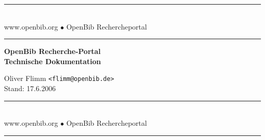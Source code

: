 \documentclass[11pt, twoside, a4paper, BCOR8mm, DIV12, bibtotoc,idxtotoc]{scrbook}
\begin{document}
\frontmatter

\begin{titlepage}

\begin{center}
\rule[-.1in]{16cm}{1mm}\\[3mm]
{\fontsize{20}{20pt}\selectfont
  www.openbib.org $\bullet$ OpenBib Rechercheportal}\\[-2mm]
\rule[-.1in]{16cm}{1mm}

\vspace{5cm}

  \textbf{\fontsize{30}{30pt}\selectfont OpenBib Recherche-Portal\\[3mm] Technische Dokumentation}

  \vspace{2cm}

  Oliver Flimm \texttt{<flimm@openbib.de>}\\
  Stand: 17.6.2006

  \vspace{8cm}

\rule[-.1in]{16cm}{1mm}\\[3mm]
{\fontsize{20}{20pt}\selectfont
  www.openbib.org $\bullet$ OpenBib Rechercheportal}\\[-2mm]
\rule[-.1in]{16cm}{1mm}

\end{center}

\end{titlepage}






\tableofcontents
\end{document}
